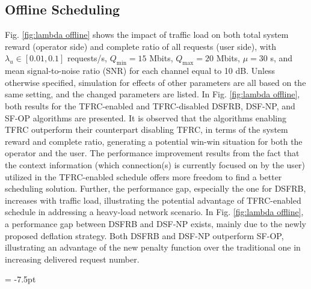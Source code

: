 \documentclass[journal,letterpaper,12pt,oneside,onecolumn,draftclsnofoot]{IEEEtran}
\begin{document}
\subsection{Offline Scheduling}

Fig. \ref{fig:lambda offline} shows the impact of traffic load on both total system reward (operator side) and complete ratio of all requests (user side),
with ${{\lambda }_{u}}\in \left[ 0.01,0.1 \right]$ requests/s, ${{Q}_{\min }}=15$ Mbits, ${{Q}_{\max }}=20$ Mbits,  $\mu =30$ s, and mean signal-to-noise ratio (SNR) for each channel equal to 10 dB.
Unless otherwise specified, simulation for effects of other parameters are all based on the same setting, and the changed parameters are listed.
In Fig. \ref{fig:lambda offline}, both results for the TFRC-enabled and TFRC-disabled DSFRB, DSF-NP, and SF-OP algorithms are presented.
It is observed that the algorithms enabling TFRC outperform their counterpart disabling TFRC, in terms of the system reward and complete ratio, generating a potential win-win situation for both the operator and the user.
The performance improvement results from the fact that the context information (which connection(s) is currently focused on by the user) utilized in the TFRC-enabled schedule offers more freedom to find a better scheduling solution.
Further, the performance gap, especially the one for DSFRB, increases with traffic load, illustrating the potential advantage of TFRC-enabled schedule in addressing a heavy-load network scenario.
In Fig. \ref{fig:lambda offline}, a performance gap between DSFRB and DSF-NP exists, mainly due to the newly proposed deflation strategy.
Both DSFRB and DSF-NP outperform SF-OP, illustrating an advantage of the new penalty function over the traditional one in  increasing delivered request number.



\begin{figure*}[tp]\subfigcapskip = -7.5pt
\centering
{}
\vspace{-0.3cm}
\caption{Impact of traffic load on total system reward and complete ratio with offline scheduling.}
\vspace{-0.5cm}
\label{fig:lambda offline}
\end{figure*}
\end{document}
